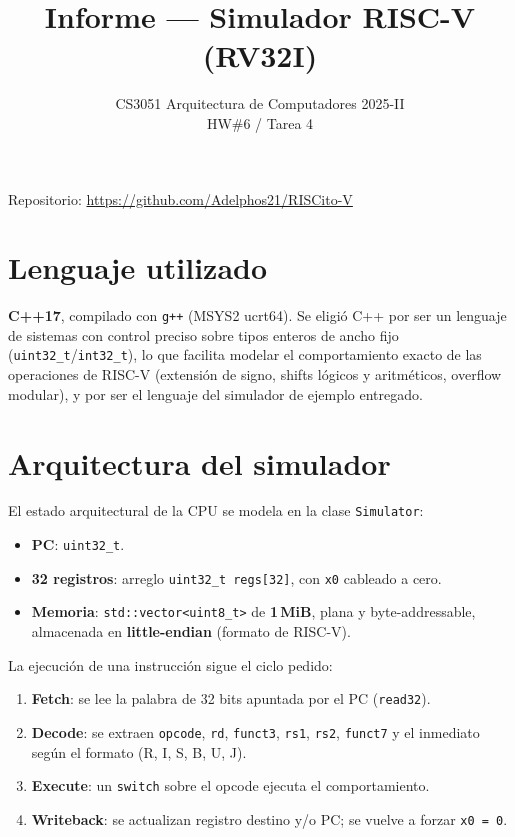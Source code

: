 \documentclass[11pt,a4paper]{article}
\title{\vspace{-1.5cm}\textbf{Informe --- Simulador RISC-V (RV32I)}}
\author{CS3051 Arquitectura de Computadores 2025-II \\ HW\#6 / Tarea 4}
\date{}
\newcommand{\code}[1]{\texttt{#1}}
\begin{document}
\maketitle
\vspace{-0.8cm}

\begin{center}
\small
Repositorio: \url{https://github.com/Adelphos21/RISCito-V}
\end{center}

\hrulefill

\section{Lenguaje utilizado}

\textbf{C++17}, compilado con \code{g++} (MSYS2 ucrt64). Se eligió C++ por ser un
lenguaje de sistemas con control preciso sobre tipos enteros de ancho fijo
(\code{uint32\_t}/\code{int32\_t}), lo que facilita modelar el comportamiento
exacto de las operaciones de RISC-V (extensión de signo, shifts lógicos y
aritméticos, overflow modular), y por ser el lenguaje del simulador de ejemplo
entregado.

\section{Arquitectura del simulador}

El estado arquitectural de la CPU se modela en la clase \code{Simulator}:

\begin{itemize}[noitemsep,topsep=2pt]
  \item \textbf{PC}: \code{uint32\_t}.
  \item \textbf{32 registros}: arreglo \code{uint32\_t regs[32]}, con \code{x0}
        cableado a cero.
  \item \textbf{Memoria}: \code{std::vector<uint8\_t>} de \textbf{1\,MiB}, plana y
        byte-addressable, almacenada en \textbf{little-endian} (formato de
        RISC-V).
\end{itemize}

La ejecución de una instrucción sigue el ciclo pedido:

\begin{enumerate}[noitemsep,topsep=2pt]
  \item \textbf{Fetch}: se lee la palabra de 32 bits apuntada por el PC
        (\code{read32}).
  \item \textbf{Decode}: se extraen \code{opcode}, \code{rd}, \code{funct3},
        \code{rs1}, \code{rs2}, \code{funct7} y el inmediato según el formato
        (R, I, S, B, U, J).
  \item \textbf{Execute}: un \code{switch} sobre el opcode ejecuta el
        comportamiento.
  \item \textbf{Writeback}: se actualizan registro destino y/o PC; se vuelve a
        forzar \code{x0 = 0}.
\end{enumerate}
\end{document}
